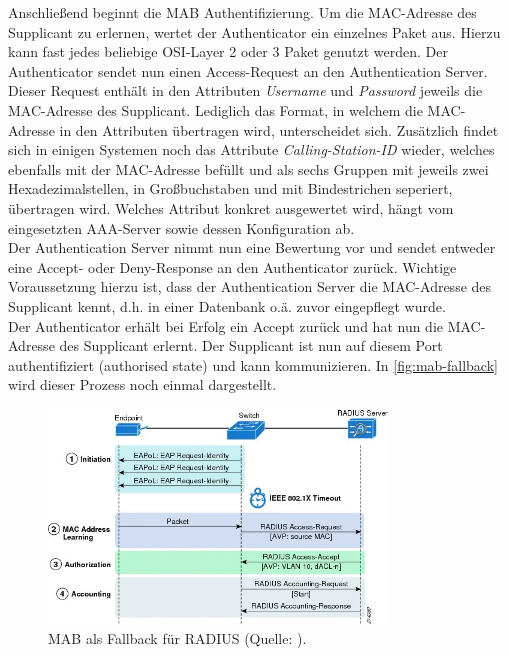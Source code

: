 \documentclass[conference]{IEEEtran}
\begin{document}
Anschließend beginnt die MAB Authentifizierung. Um die MAC-Adresse des Supplicant zu erlernen, wertet der Authenticator ein einzelnes Paket aus. Hierzu kann fast jedes beliebige OSI-Layer 2 oder 3 Paket genutzt werden. Der Authenticator sendet nun einen Access-Request an den Authentication Server. Dieser Request enthält in den Attributen \emph{Username} und \emph{Password} jeweils die MAC-Adresse des Supplicant. \cite{mab-deployment-guide} Lediglich das Format, in welchem die MAC-Adresse in den Attributen übertragen wird, unterscheidet sich. Zusätzlich findet sich in einigen Systemen noch das Attribute \emph{Calling-Station-ID} wieder, welches ebenfalls mit der MAC-Adresse befüllt und als sechs Gruppen mit jeweils zwei Hexadezimalstellen, in Großbuchstaben und mit Bindestrichen seperiert, übertragen wird. Welches Attribut konkret ausgewertet wird, hängt vom eingesetzten AAA-Server sowie dessen Konfiguration ab.\\

Der Authentication Server nimmt nun eine Bewertung vor und sendet entweder eine Accept- oder Deny-Response an den Authenticator zurück. Wichtige Voraussetzung hierzu ist, dass der Authentication Server die MAC-Adresse des Supplicant kennt, d.h. in einer Datenbank o.ä. zuvor eingepflegt wurde.\\

Der Authenticator erhält bei Erfolg ein Accept zurück und hat nun die MAC-Adresse des Supplicant erlernt. Der Supplicant ist nun auf diesem Port authentifiziert (authorised state) und kann kommunizieren. In \autoref{fig:mab-fallback} wird dieser Prozess noch einmal dargestellt.\\

\begin{figure}[hbt]
	\centering
	\includegraphics[width=9cm]{figures/mab-fallback}
	\caption{MAB als Fallback für RADIUS (Quelle: \cite{mab-deployment-guide}).}
	\label{fig:mab-fallback}
\end{figure}
\end{document}
